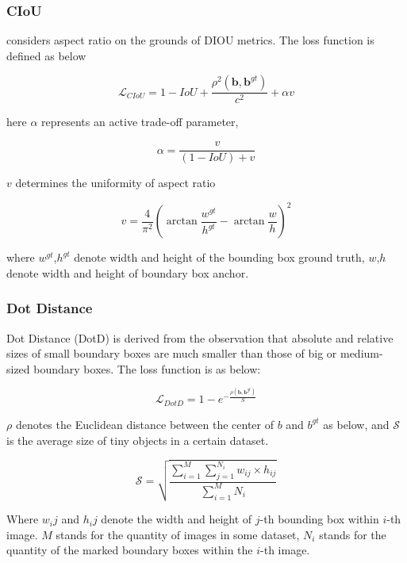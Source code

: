 \documentclass[journal]{IEEEtran}
\begin{document}
\subsubsection{CIoU}
considers aspect ratio on the grounds of DIOU metrics\cite{zheng2019distanceiou}. The loss function is defined as below

\begin{center} %
\begin{equation}
\mathcal{L}_{C I o U}=1-I o U+\frac{\rho^2\left(\mathbf{b}, \mathbf{b}^{g t}\right)}{c^2}+\alpha v
\end{equation}
\end{center}

here ${\alpha}$ represents an active trade-off parameter, 
\begin{center} %
\begin{equation}
\alpha=\frac{v}{(1-I o U)+v}
\end{equation}
\end{center}

$v$ determines the uniformity of aspect ratio
\begin{center} %
\begin{equation}
v=\frac{4}{\pi^2}\left(\arctan \frac{w^{g t}}{h^{g t}}-\arctan \frac{w}{h}\right)^2
\end{equation}
\end{center}
where $w^{g t}$,$h^{g t}$ denote width and height of the bounding box
ground truth, $w$,$h$ denote width and height of boundary box anchor.
\subsubsection{Dot Distance}
Dot Distance (DotD) is derived from the observation that absolute and relative sizes of small boundary boxes are much smaller than those of big or medium-sized boundary boxes. The loss function is as below:

\begin{center} %
\begin{equation}
\mathcal{L}_{D o t D}=1-e^{-\frac{\rho\left(\mathbf{b}, \mathbf{b}^{g t}\right)}{S}}
\end{equation}
\end{center}
$\rho$ denotes the Euclidean distance between the center of  $b$ and $b^{g t}$ as below, and $\mathcal{S}$ is the average size of tiny objects in a certain dataset.

\begin{center} %
\begin{equation}
\mathcal{S}=\sqrt{\frac{\sum_{i=1}^M \sum_{j=1}^{N_i} w_{i j} \times h_{i j}}{\sum_{i=1}^M N_i}}
\end{equation}
\end{center}
Where  $w_ij$ and $h_ij$ denote the width and height of $j$-th bounding box within $i$-th image. $M$ stands for the quantity of images in some dataset, $N_i$ stands for the quantity of the marked boundary boxes within the $i$-th image.
\end{document}
